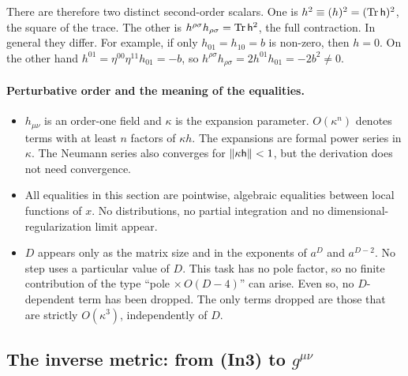 There are therefore two distinct second-order scalars. One is
$h^2\equiv(h)^2=(\operatorname{Tr}\mathsf{h})^2$, the square of the trace. The other is
$h^{\rho\sigma}h_{\rho\sigma}=\operatorname{Tr}\mathsf{h}^2$, the full contraction. In general
they differ. For example, if only $h_{01}=h_{10}=b$ is non-zero, then $h=0$.
On the other hand $h^{01}=\eta^{00}\eta^{11}h_{01}=-b$, so
$h^{\rho\sigma}h_{\rho\sigma}=2h^{01}h_{01}=-2b^2\neq0$.

\paragraph{Perturbative order and the meaning of the equalities.} \tA
\label{sec:ch1-t1-order}
\begin{itemize}[leftmargin=1.4em]
\item $h_{\mu\nu}$ is an order-one field and $\kappa$ is the expansion
parameter. $O(\kappa^n)$ denotes terms with at least $n$ factors of
$\kappa h$. The expansions are formal power series in $\kappa$. The Neumann
series also converges for $\|\kappa\mathsf{h}\|<1$, but the derivation does not need
convergence.
\item All equalities in this section are pointwise, algebraic equalities
between local functions of $x$. No distributions, no partial integration and no
dimensional-regularization limit appear.
\item $D$ appears only as the matrix size and in the exponents of $a^D$ and
$a^{D-2}$. No step uses a particular value of $D$. This task has no pole
factor, so no finite contribution of the type ``pole $\times\,O(D-4)$'' can arise.
Even so, no $D$-dependent term has been dropped. The only terms dropped are
those that are strictly $O(\kappa^3)$, independently of $D$.
\end{itemize}

\subsection{The inverse metric: from (In3) to \texorpdfstring{$g^{\mu\nu}$}{g\textasciicircum\{mu nu\}}}
\label{sec:ch1-t1-inverse}

